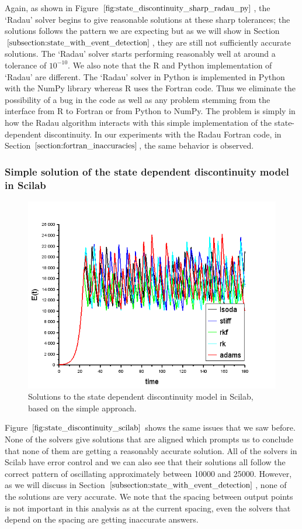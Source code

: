 Again, as shown in Figure $\ref{fig:state_discontinuity_sharp_radau_py}$, the `Radau' solver begins to give reasonable solutions at these sharp tolerances; the solutions follows the pattern we are expecting but as we will show in Section $\ref{subsection:state_with_event_detection}$, they are still not sufficiently accurate solutions. The `Radau' solver starts performing reasonably well at around a tolerance of $10^{-10}$. We also note that the R and Python implementation of `Radau' are different. The `Radau' solver in Python is implemented in Python with the NumPy library whereas R uses the Fortran code. Thus we eliminate the possibility of a bug in the code as well as any problem stemming from the interface from R to Fortran or from Python to NumPy. The problem is simply in how the Radau algorithm interacts with this simple implementation of the state-dependent discontinuity. In our experiments with the Radau Fortran code, in Section $\ref{section:fortran_inaccuracies}$, the same behavior is observed.

\subsubsection{Simple solution of the state dependent discontinuity model in Scilab}
\begin{figure}[H]
\centering
\includegraphics[width=0.7\linewidth]{./figures/state_discontinuity_scilab}
\caption{Solutions to the state dependent discontinuity model in Scilab, based on the simple approach.}
\label{fig:state_discontinuity_scilab}
\end{figure}

Figure $\ref{fig:state_discontinuity_scilab}$ shows the same issues that we saw before. None of the solvers give solutions that are aligned which prompts us to conclude that none of them are getting a reasonably accurate solution. All of the solvers in Scilab have error control and we can also see that their solutions all follow the correct pattern of oscillating approximately between 10000 and 25000. However, as we will discuss in Section $\ref{subsection:state_with_event_detection}$, none of the solutions are very accurate. We note that the spacing between output points is not important in this analysis as at the current spacing, even the solvers that depend on the spacing are getting inaccurate answers.

